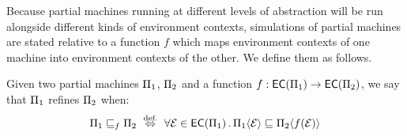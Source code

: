 Because partial machines
running at different levels of abstraction
will be run alongside different kinds of environment contexts,
simulations of partial machines are stated relative to
a function $f$ which maps
environment contexts of one machine into
environment contexts of the other.
We define them as follows.

\begin{definition}
Given two partial machines $\Pi_1$, $\Pi_2$ and
a function $f : {{\mathsf{EC}}({\Pi_1})} \rightarrow {{\mathsf{EC}}({\Pi_2})}$,
we say that $\Pi_1$ refines $\Pi_2$ when:
\[ \Mach_1 \refines_f \Mach_2
	\ \stackrel{\text{def.}}{\Leftrightarrow}\ 
	\forall \Env \in \EC{\Mach_1} \,.\,
		\Mach_1 \langle \Env \rangle \refines
		\Mach_2 \langle f(\Env) \rangle \]
\end{definition}

%

